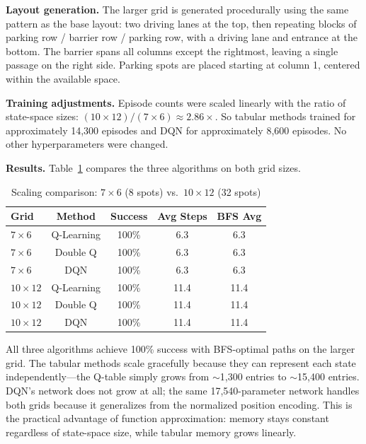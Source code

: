 \documentclass[letterpaper]{article}
\begin{document}
\textbf{Layout generation.} The larger grid is generated procedurally using the same pattern as the base layout: two driving lanes at the top, then repeating blocks of parking row / barrier row / parking row, with a driving lane and entrance at the bottom. The barrier spans all columns except the rightmost, leaving a single passage on the right side. Parking spots are placed starting at column 1, centered within the available space.

\textbf{Training adjustments.} Episode counts were scaled linearly with the ratio of state-space sizes: $(10 \times 12) / (7 \times 6) \approx 2.86\times$. So tabular methods trained for approximately 14,300 episodes and DQN for approximately 8,600 episodes. No other hyperparameters were changed.

\textbf{Results.} Table~\ref{tab:scaling} compares the three algorithms on both grid sizes.

\begin{table}[H]
\centering
\caption{Scaling comparison: $7 \times 6$ (8 spots) vs.\ $10 \times 12$ (32 spots)}
\label{tab:scaling}
\begin{tabular}{@{}lcccc@{}}
\toprule
Grid & Method & Success & Avg Steps & BFS Avg \\
\midrule
$7 \times 6$ & Q-Learning    & 100\% & 6.3 & 6.3 \\
$7 \times 6$ & Double Q      & 100\% & 6.3 & 6.3 \\
$7 \times 6$ & DQN           & 100\% & 6.3 & 6.3 \\
\midrule
$10 \times 12$ & Q-Learning  & 100\% & 11.4 & 11.4 \\
$10 \times 12$ & Double Q    & 100\% & 11.4 & 11.4 \\
$10 \times 12$ & DQN         & 100\% & 11.4 & 11.4 \\
\bottomrule
\end{tabular}
\end{table}

All three algorithms achieve 100\% success with BFS-optimal paths on the larger grid. The tabular methods scale gracefully because they can represent each state independently---the Q-table simply grows from $\sim$1,300 entries to $\sim$15,400 entries. DQN's network does not grow at all; the same 17,540-parameter network handles both grids because it generalizes from the normalized position encoding. This is the practical advantage of function approximation: memory stays constant regardless of state-space size, while tabular memory grows linearly.
\end{document}
